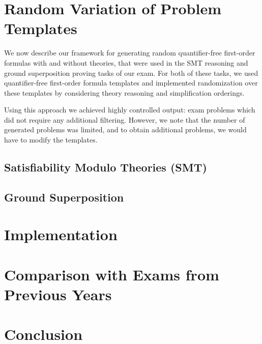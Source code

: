 \documentclass[12pt]{llncs}
\begin{document}
\section{Random Variation of Problem Templates}\label{sec:smtqf}

We now describe our framework for generating random quantifier-free
first-order formulas with and without theories, that were used in
the SMT reasoning and ground
superposition proving tasks of our exam. For both of these tasks, we
used quantifier-free first-order formula templates and implemented
randomization over these templates by considering theory reasoning and
simplification orderings.

Using this approach we achieved highly controlled output:
exam problems which did not require any additional filtering. However, we
note that the number of generated problems was limited, and to obtain
additional problems, we would have to modify the templates.

\subsection{Satisfiability Modulo Theories (SMT)}\label{sec:smt}





\subsection{Ground Superposition}\label{sec:qf}

\label{sec:gs}



\section{Implementation}\label{sec:implementation}



\section{Comparison with Exams from Previous Years}\label{sec:comparison}



\section{Conclusion}
\end{document}
